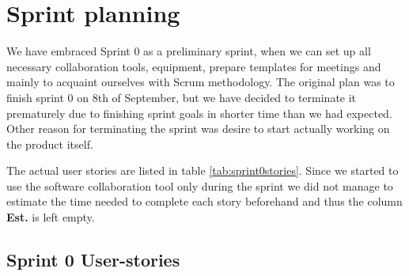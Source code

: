\section{Sprint planning}
We have embraced Sprint 0 as a preliminary sprint, when we can set up all necessary collaboration tools, equipment, prepare templates for meetings and mainly to acquaint ourselves with Scrum methodology. The original plan was to finish sprint 0 on 8th of September, but we have decided to terminate it prematurely due to finishing sprint goals in shorter time than we had expected. Other reason for terminating the sprint was desire to start actually working on the product itself.

The actual user stories are listed in table \ref{tab:sprint0stories}. Since we started to use the software collaboration tool only during the sprint we did not manage to estimate the time needed to complete each story beforehand and thus the column \textbf{Est.} is left empty.

\subsection{Sprint 0 User-stories}


